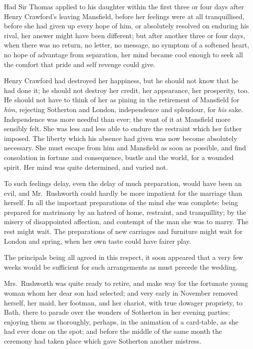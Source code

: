 Had Sir Thomas applied to his daughter within the first
three or four days after Henry Crawford's leaving Mansfield,
before her feelings were at all tranquillised, before she
had given up every hope of him, or absolutely resolved on
enduring his rival, her answer might have been different;
but after another three or four days, when there was no return,
no letter, no message, no symptom of a softened heart,
no hope of advantage from separation, her mind became
cool enough to seek all the comfort that pride and self
revenge could give.

Henry Crawford had destroyed her happiness, but he
should not know that he had done it; he should not
destroy her credit, her appearance, her prosperity, too.
He should not have to think of her as pining in the
retirement of Mansfield for \emph{him}, rejecting Sotherton
and London, independence and splendour, for \emph{his} sake.
Independence was more needful than ever; the want of it
at Mansfield more sensibly felt.  She was less and less
able to endure the restraint which her father imposed.
The liberty which his absence had given was now become
absolutely necessary.  She must escape from him and Mansfield
as soon as possible, and find consolation in fortune
and consequence, bustle and the world, for a wounded spirit.
Her mind was quite determined, and varied not.

To such feelings delay, even the delay of much preparation,
would have been an evil, and Mr.\ Rushworth could hardly
be more impatient for the marriage than herself.
In all the important preparations of the mind she
was complete:  being prepared for matrimony by an hatred
of home, restraint, and tranquillity; by the misery
of disappointed affection, and contempt of the man she
was to marry.  The rest might wait.  The preparations
of new carriages and furniture might wait for London
and spring, when her own taste could have fairer play.

The principals being all agreed in this respect, it soon
appeared that a very few weeks would be sufficient
for such arrangements as must precede the wedding.

Mrs.\ Rushworth was quite ready to retire, and make way for
the fortunate young woman whom her dear son had selected;
and very early in November removed herself, her maid,
her footman, and her chariot, with true dowager propriety,
to Bath, there to parade over the wonders of Sotherton
in her evening parties; enjoying them as thoroughly,
perhaps, in the animation of a card-table, as she had
ever done on the spot; and before the middle of the same
month the ceremony had taken place which gave Sotherton
another mistress.

